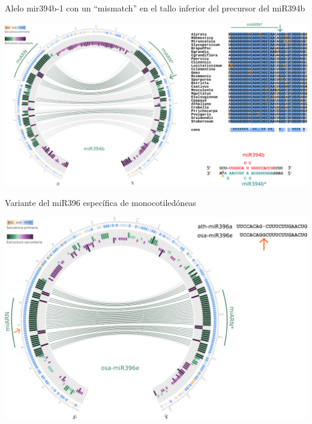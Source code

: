 \documentclass{beamer}
\begin{document}
\begin{frame}{Alelo mir394b-1 con un ``mismatch'' en el tallo inferior del precursor del miR394b}
	\begin{center}
		\includegraphics[width=.8\textwidth]{img/miR394b_circos_aliniamientos.png}
	\end{center}
    \begin{center}
    \end{center}
\end{frame}




\begin{frame}{Variante del miR396 específica de monocotiledóneas}
	\begin{center}
		\includegraphics[width=.8\textwidth]{img/circos_monocots_miR396e_defensa.png}
	\end{center}
    \begin{center}
    \end{center}
\end{frame}
\end{document}
